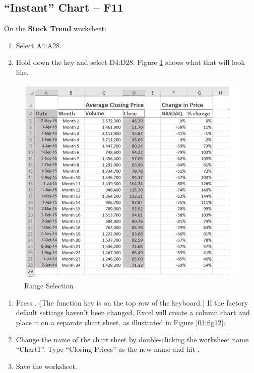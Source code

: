 \subsection{``Instant'' Chart – F11}

On the \textbf{Stock Trend} worksheet:

\begin{enumerate}
	\item Select \textsf{A4:A28}.
	\item Hold down the  key and select \textsf{D4:D28}. Figure \ref{04:fig11} shows what that will look like.
\end{enumerate}

\begin{figure}[H]
	\centering
	\includegraphics[width=\maxwidth{.95\linewidth}]{gfx/ch04_fig11}
	\caption{Range Selection}
	\label{04:fig11}
\end{figure}

\begin{enumerate}[resume]
	\item Press . (The  function key is on the top row of the keyboard.) If the factory default settings haven't been changed, Excel will create a column chart and place it on a separate chart sheet, as illustrated in Figure \ref{04:fig12}.
	\item Change the name of the chart sheet by double-clicking the worksheet name ``Chart1''. Type ``Closing Prices'' as the new name and hit .
	\item Save the worksheet.
\end{enumerate}

